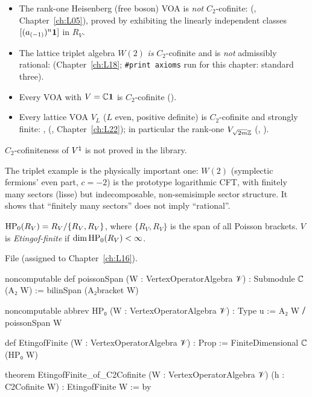 \begin{example}\label{l12:ex:c2}
\begin{itemize}
\item The rank-one Heisenberg (free boson) VOA is \emph{not} $C_2$-cofinite: 
  (, Chapter~\ref{ch:L05}), proved by exhibiting the
  linearly independent classes $[(a_{(-1)})^n\mathbf{1}]$ in $R_V$.
\item The lattice triplet algebra $W(2)$ \emph{is} $C_2$-cofinite and is \emph{not} admissibly rational:
  \allowbreak{}\allowbreak{}\allowbreak{}\allowbreak{}\allowbreak{}\allowbreak{}\allowbreak{}\allowbreak{}
  (Chapter~\ref{ch:L18}; \texttt{\#print axioms} run for this chapter: standard three).
\item Every VOA with $V = {\mathbb{C}}\mathbf{1}$ is $C_2$-cofinite ().
\item Every lattice VOA $V_L$ ($L$ even, positive definite) is $C_2$-cofinite and strongly finite:
  , 
  (, Chapter~\ref{ch:L22}); in
  particular the rank-one $V_{\sqrt{2m}{\mathbb{Z}}}$ (, ).
\end{itemize}
$C_2$-cofiniteness of ${V^{\natural}}$ is not proved in the library.
\end{example}

\begin{physics}
The triplet example is the physically important one: $W(2)$ (symplectic fermions' even part, $c=-2$) is the
prototype logarithmic CFT, with finitely many sectors (lisse) but indecomposable, non-semisimple sector
structure. It shows that ``finitely many sectors'' does not imply ``rational''.
\end{physics}

\begin{definition}\label{l12:def:etingof}
$\mathrm{HP}_0(R_V) = R_V/\{R_V,R_V\}$, where $\{R_V,R_V\}$ is the span of all Poisson brackets. $V$ is
\emph{Etingof-finite} if $\dim\mathrm{HP}_0(R_V)<\infty$.
\end{definition}
\noindent File  (assigned to Chapter~\ref{ch:L16}).
\begin{leancode}
noncomputable def poissonSpan (W : VertexOperatorAlgebra 𝒱) : Submodule ℂ (A₂ W) :=
  bilinSpan (A₂bracket W)

noncomputable abbrev HP₀ (W : VertexOperatorAlgebra 𝒱) : Type u := A₂ W ⧸ poissonSpan W

def EtingofFinite (W : VertexOperatorAlgebra 𝒱) : Prop := FiniteDimensional ℂ (HP₀ W)

theorem EtingofFinite_of_C2Cofinite (W : VertexOperatorAlgebra 𝒱) (h : C2Cofinite W) :
    EtingofFinite W := by
\end{leancode}

